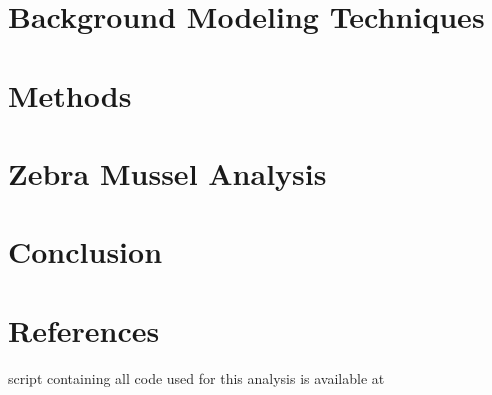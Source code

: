 \documentclass[12pt]{article}\usepackage[]{graphicx}\usepackage[]{color}
\begin{document}
\section{Background Modeling Techniques}

  
\section{Methods}


\section{Zebra Mussel Analysis}


\section{Conclusion}


\newpage
\section{References}
\begingroup
\renewcommand{\section}[2]{}%
\begin{flushleft}

%
%
%
%

\end{flushleft}
\endgroup

\newpage
\section{Appendix - R Code}

A script containing all code used for this analysis is available at \\

\end{document}
